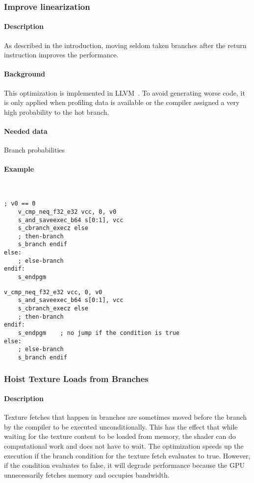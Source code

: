 \subsubsection{Improve linearization}
\paragraph{Description} As described in the introduction, moving seldom taken branches after the return instruction improves the performance.
\paragraph{Background} This optimization is implemented in LLVM~\cite{llvmLinearization}. To avoid generating worse code, it is only applied when profiling data is available or the compiler assigned a very high probability to the hot branch.
\paragraph{Needed data} Branch probabilities
\paragraph{Example}\ \\
\begin{minipage}{.47\textwidth}
	\begin{lstlisting}[caption={Linearization --- unoptimized},frame=tlrb,language={[amdgpu]Assembler}]
	; v0 == 0
	v_cmp_neq_f32_e32 vcc, 0, v0
	s_and_saveexec_b64 s[0:1], vcc
	s_cbranch_execz else
	; then-branch
	s_branch endif
else:
	; else-branch
endif:
	s_endpgm
	\end{lstlisting}
\end{minipage}\hfill
\begin{minipage}{.47\textwidth}
	\begin{lstlisting}[caption={Linearization --- optimized},frame=tlrb,language={[amdgpu]Assembler}]
	v_cmp_neq_f32_e32 vcc, 0, v0
	s_and_saveexec_b64 s[0:1], vcc
	s_cbranch_execz else
	; then-branch
endif:
	s_endpgm    ; no jump if the condition is true
else:
	; else-branch
	s_branch endif
	\end{lstlisting}
\end{minipage}

\subsubsection{Hoist Texture Loads from Branches}
\paragraph{Description} Texture fetches that happen in branches are sometimes moved before the branch by the compiler to be executed unconditionally. This has the effect that while waiting for the texture content to be loaded from memory, the shader can do computational work and does not have to wait. The optimization speeds up the execution if the branch condition for the texture fetch evaluates to true. However, if the condition evaluates to false, it will degrade performance because the GPU unnecessarily fetches memory and occupies bandwidth.
